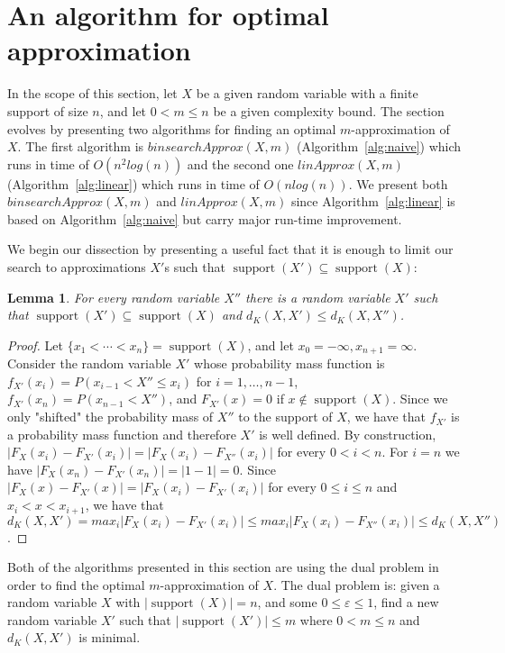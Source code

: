 \documentclass[letterpaper]{article} %
\newtheorem{lemma}[thm]{Lemma}
\DeclareMathOperator{\support}{support}
\begin{document}
\section{An algorithm for optimal approximation}\label{sec:algEfficient}
In the scope of this section, let $X$ be a given random variable with a finite support of size $n$, and let  $0<m\leq n$ be a given complexity bound. The section evolves by presenting two algorithms for finding an optimal $m$-approximation of $X$. The first algorithm is $binsearchApprox(X,m)$ (Algorithm~\ref{alg:naive}) which runs in time of $O(n^2log(n))$ and the second one $linApprox(X,m)$ (Algorithm~\ref{alg:linear}) which runs in time of $O(nlog(n))$. We present both $binsearchApprox(X,m)$ and $linApprox(X,m)$ since Algorithm~\ref{alg:linear} is based on Algorithm~\ref{alg:naive} but carry major run-time improvement.

We begin our dissection by presenting a useful fact that it is enough to limit our search to approximations $X'$s such that $\support(X') \subseteq \support(X)$:

\begin{lemma}\label{lem:supContained}
	For every random variable $X''$ there is a random variable $X'$ such that $\support(X') \subseteq \support(X)$ and $d_{K}(X,X')\leq d_{K}(X,X'')$.
\end{lemma}

\begin{proof}
	Let $\{x_1 <\cdots<x_n\} = \support(X)$, and let $x_0 = -\infty, x_{n+1}=\infty$. Consider the random variable $X'$ whose probability mass function is
	$f_{X'}(x_i) = P(x_{i-1} < X'' \leq x_i)$ for $i=1,\dots,n-1$,  $f_{X'}(x_n) = P(x_{n-1} < X'')$, and $F_{X'}(x)=0$ if $x\notin \support(X)$.  Since we only "shifted" the probability mass of $X''$ to the support of $X$, we have that $f_{X'}$ is a probability mass function and therefore $X'$ is well defined. 	
	By construction, $|F_{X}(x_i)-F_{X'}(x_i)| = |F_{X}(x_i)-F_{X''}(x_i)|$ for every  $0 <  i < n$. For $i=n$ we have $|F_{X}(x_n)-F_{X'}(x_n)| = |1-1|=0$.
	Since $|F_{X}(x)-F_{X'}(x)| = |F_{X}(x_i)-F_{X'}(x_i)|$ for every  $0\leq   i  \leq  n$  and $x_i<x<x_{i+1}$, we have that $d_K(X,X')=max_{i}|F_{X}(x_i)-F_{X'}(x_i)|\leq max_{i}|F_{X}(x_i)-F_{X''}(x_i)|\leq d_K(X,X'')$.
\end{proof} 

Both of the algorithms presented in this section are using the dual problem in order to find the optimal $m$-approximation of $X$. The dual problem is: given a random variable $X$ with $|\support(X)| = n$, and some $0 \leq \varepsilon \leq 1$, find a new random variable $X'$ such that $|\support(X')|\leq m$ where $0< m \leq n$ and $d_K(X,X')$ is minimal. 
\end{document}
